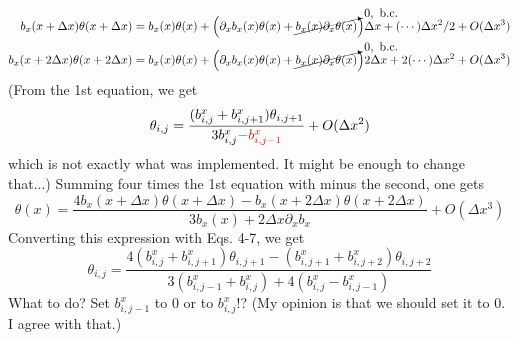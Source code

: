 \documentclass[notitlepage]{revtex4-2}
\begin{document}
\begin{align}
b_x(x+\Delta x)\theta(x+\Delta x) &= b_x(x)\theta(x) + \Big(\partial_x b_x(x) \theta(x)+ \cancelto{0,\text{ b.c.}}{b_x(x)\partial_x \theta(x)}\Big)\Delta x + (\cdots)\Delta x^2/2 + O(\Delta x^3)\\
b_x(x+2\Delta x)\theta(x+2\Delta x) &= b_x(x)\theta(x) + \Big(\partial_x b_x(x)\theta(x)+ \cancelto{0,\text{ b.c.}}{b_x(x)\partial_x \theta(x)}\Big)2\Delta x + 2(\cdots)\Delta x^2 + O(\Delta x^3)
\end{align}
(From the 1st equation, we get
\begin{equation}
\theta_{i,j}=\frac{(b^x_{i,j}+b^x_{i,j+1})\theta_{i,j+1}}{3 b^x_{i,j} {\color{red}- b^x_{i,j-1}}}+O(\Delta x^2)
\end{equation}
which is not exactly what was implemented. It might be enough to change that...)
Summing four times the 1st equation with minus the second, one gets
\begin{equation}
\theta(x) = \frac{4b_x(x+\Delta x)\theta(x+\Delta x)-b_x(x+2\Delta x)\theta(x+2\Delta x)}{3b_x(x)+2\Delta x\partial_xb_x}+O(\Delta x^3)
\end{equation}
Converting this expression with Eqs. 4-7, we get
\begin{equation}\label{eq:thetanx}
\theta_{i,j} = \frac{4(b^x_{i,j}+b^x_{i,j+1})\theta_{i,j+1} - (b^x_{i,j+1}+b^x_{i,j+2})\theta_{i,j+2}}{3(b^x_{i,j-1}+b^x_{i,j})+4(b^x_{i,j}-b^x_{i,j-1})}
\end{equation}
What to do? Set $b^x_{i,j-1}$ to $0$ or to $b^x_{i,j}$!? (My opinion is that we should set it to 0. {\color{red}I agree with that.})
\end{document}
